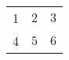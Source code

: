 \documentclass[a4paper=true]{scrartcl}
\begin{document}
	\begin{tabular}{lll}
	1 & $2$& $3$ \\
4 & $5$& $6$ \\

\end{tabular}
\end{document}
